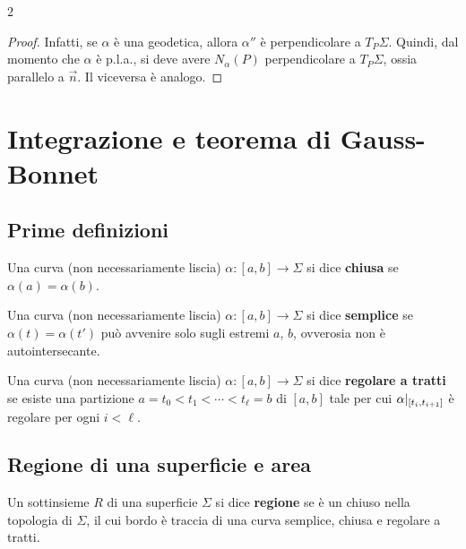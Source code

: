 \begin{multicols*}{2}
    \begin{proof}
        Infatti, se $\alpha$ è una geodetica, allora $\alpha''$ è perpendicolare a
        $T_P \Sigma$. Quindi, dal momento che $\alpha$ è p.l.a., si deve avere
        $N_\alpha(P)$ perpendicolare a $T_P \Sigma$, ossia parallelo
        a $\vec{n}$. Il viceversa è analogo.
    \end{proof}

    \section{Integrazione e teorema di Gauss-Bonnet}

    \subsection{Prime definizioni}

    \begin{definition}
        Una curva (non necessariamente liscia) $\alpha : [a, b] \to \Sigma$ si dice
        \textbf{chiusa} se $\alpha(a) = \alpha(b)$.
    \end{definition}

    \begin{definition}
        Una curva (non necessariamente liscia) $\alpha : [a, b] \to \Sigma$ si dice
        \textbf{semplice} se $\alpha(t) = \alpha(t')$ può avvenire solo
        sugli estremi $a$, $b$, ovverosia non è autointersecante.
    \end{definition}

    \begin{definition}
        Una curva (non necessariamente liscia) $\alpha : [a, b] \to \Sigma$ si dice
        \textbf{regolare a tratti} se esiste una partizione $a = t_0 < t_1 < \cdots < t_\ell = b$
        di $[a, b]$ tale per cui $\alpha\arrowvert_{[t_i, t_{i+1}]}$ è regolare per ogni
        $i < \ell$.
    \end{definition}

    \subsection{Regione di una superficie e area}

    \begin{definition}[Regione]
        Un sottinsieme $R$ di una superficie $\Sigma$ si dice \textbf{regione} se
        è un chiuso nella topologia di $\Sigma$, il cui bordo è traccia di una
        curva semplice, chiusa e regolare a tratti.
    \end{definition}


\end{multicols*}
